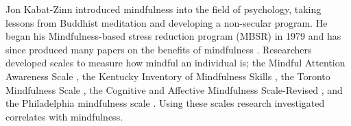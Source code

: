 Jon Kabat-Zinn introduced mindfulness into the field of psychology, taking lessons from Buddhist meditation and developing a non-secular program. He began his Mindfulness-based stress reduction program (MBSR) in 1979 and has since produced many papers on the benefits of mindfulness \citep{kabat-zinn_outpatient_1982,kabat-zinn_clinical_1985,kabat-zinn_effectiveness_1992,miller_three-year_1995,kabat-zinn_influence_1998,samuelson_mindfulness-based_2007,ludwig_mindfulness_2008}. Researchers developed scales to measure how mindful an individual is; the Mindful Attention Awareness Scale \cite{brown_benefits_2003}, the Kentucky Inventory of Mindfulness Skills \cite{baer_assessment_2004}, the Toronto Mindfulness Scale \cite{lau_toronto_2006}, the Cognitive and Affective Mindfulness Scale-Revised \cite{feldman_mindfulness_2007}, and the Philadelphia mindfulness scale \cite{cardaciotto_assessment_2008}. Using these scales research investigated correlates with mindfulness.